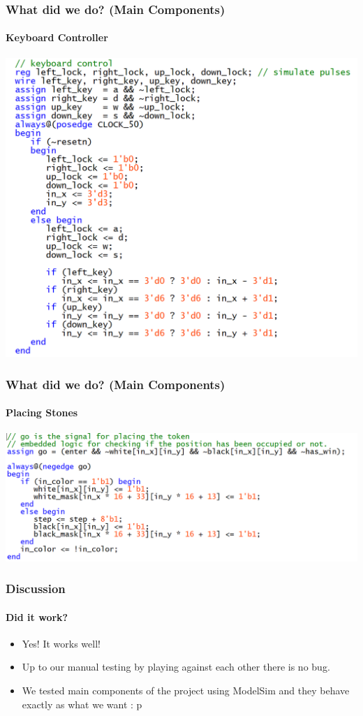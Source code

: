 \documentclass{beamer}
\begin{document}
\begin{frame}
    \frametitle{What did we do? (Main Components)}
    \framesubtitle{Keyboard Controller}
    \center \includegraphics[scale=0.4]{keyboard.png}
\end{frame}

\begin{frame}
    \frametitle{What did we do? (Main Components)}
    \framesubtitle{Placing Stones}
    \center \includegraphics[scale=0.4]{place_go.png}
\end{frame}

\begin{frame}
    \frametitle{Discussion}
    \framesubtitle{Did it work?}
    \begin{itemize}
        \item Yes! It works well!
        \item Up to our manual testing by playing against each other there is no bug.
        \item We tested main components of the project using ModelSim and they behave exactly as what we want : p
    \end{itemize}
\end{frame}
\end{document}
